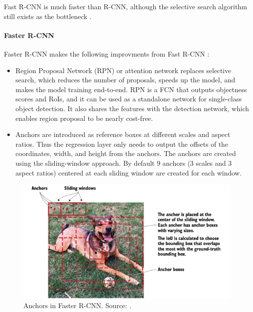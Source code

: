 \documentclass[a4paper, 11pt, oneside]{article}
\begin{document}
  Fast R-CNN is much faster than R-CNN, although the selective search algorithm still exists as the bottleneck
  \cite{elgendy2020deep, girshick2015fast, ren2015faster}.

  \paragraph{Faster R-CNN}

  Faster R-CNN makes the following improvments from Fast R-CNN \cite{elgendy2020deep, ren2015faster}:

  \begin{itemize}
    \item Region Proposal Network (RPN) or attention network replaces selective search, which reduces the number of
    proposals, speeds up the model, and makes the model training end-to-end. RPN is a FCN that outputs objectness scores
    and RoIs, and it can be used as a standalone network for single-class object detection. It also shares the features
    with the detection network, which enables region proposal to be nearly cost-free.
    \item Anchors are introduced as reference boxes at different scales and aspect ratios. Thus the regression layer
    only needs to output the offsets of the coordinates, width, and height from the anchors. The anchors are created using
    the sliding-window approach. By default 9 anchors (3 scales and 3 aspect ratios) centered at each sliding window are
    created for each window.
  \end{itemize}

  \begin{figure}[ht]
    \begin{center}
      \includegraphics[width=.8\textwidth]{anchors.png}
    \end{center}
    \caption{Anchors in Faster R-CNN. Source: \cite{elgendy2020deep}.}
  \end{figure}
\end{document}
